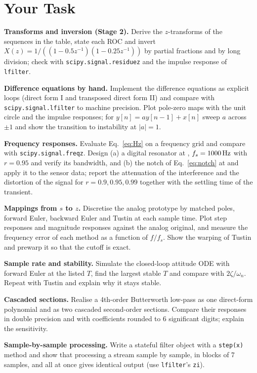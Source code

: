\documentclass[11pt,a4paper]{article}
\begin{document}
\section*{Your Task}
\begin{tasks}
  \item \textbf{Transforms and inversion (Stage 2).} Derive the $z$-transforms of the sequences in the table, state each ROC and invert $X(z)=1/((1-0.5z^{-1})(1-0.25z^{-1}))$ by partial fractions and by long division; check with \texttt{scipy.signal.residuez} and the impulse response of \texttt{lfilter}.
  \item \textbf{Difference equations by hand.} Implement the difference equations as explicit loops (direct form I and transposed direct form II) and compare with \texttt{scipy.signal.lfilter} to machine precision. Plot pole-zero maps with the unit circle and the impulse responses; for $y[n]=ay[n-1]+x[n]$ sweep $a$ across $\pm1$ and show the transition to instability at $|a|=1$.
  \item \textbf{Frequency responses.} Evaluate Eq.~\eqref{eq:Hz} on a frequency grid and compare with \texttt{scipy.signal.freqz}. Design (a) a digital resonator at , $f_s=\SI{1000}{\hertz}$ with $r=0.95$ and verify its bandwidth, and (b) the notch of Eq.~\eqref{eq:notch} at  and apply it to the sensor data; report the attenuation of the interference and the distortion of the  signal for $r=0.9,0.95,0.99$ together with the settling time of the transient.
  \item \textbf{Mappings from $s$ to $z$.} Discretise the analog prototype by matched poles, forward Euler, backward Euler and Tustin at each sample time. Plot step responses and magnitude responses against the analog original, and measure the frequency error of each method as a function of $f/f_s$. Show the warping of Tustin and prewarp it so that the cutoff is exact.
  \item \textbf{Sample rate and stability.} Simulate the closed-loop attitude ODE with forward Euler at the listed $T$, find the largest stable $T$ and compare with $2\zeta/\omega_n$. Repeat with Tustin and explain why it stays stable.
  \item \textbf{Cascaded sections.} Realise a 4th-order Butterworth low-pass as one direct-form polynomial and as two cascaded second-order sections. Compare their responses in double precision and with coefficients rounded to 6 significant digits; explain the sensitivity.
  \item \textbf{Sample-by-sample processing.} Write a stateful filter object with a \texttt{step(x)} method and show that processing a stream sample by sample, in blocks of 7 samples, and all at once gives identical output (use \texttt{lfilter}'s \texttt{zi}).
\end{tasks}
\end{document}
